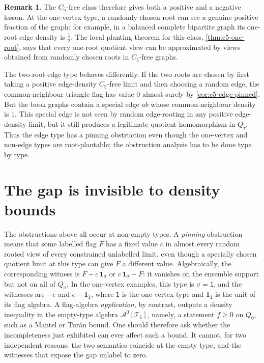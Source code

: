\documentclass[11pt]{article}
\theoremstyle{definition}
\newtheorem{remark}[remark]{Remark}
\newcommand{\A}{\mathcal{A}}
\newcommand{\T}{\mathcal{T}}
\newcommand{\one}{\mathbf 1}
\newcommand{\vtype}{\mathsf{1}}
\begin{document}
\begin{remark}
The $C_5$-free class therefore gives both a positive and a negative lesson.  At the
one-vertex type, a randomly chosen root can see a genuine positive fraction of the graph:
for example, in a balanced complete bipartite graph its one-root edge density is
$\tfrac12$.  The local planting theorem for this class, \cref{thm:c5-one-root}, says that
every one-root quotient view can be approximated by views obtained from randomly chosen
roots in $C_5$-free graphs.

The two-root edge type behaves differently.  If the two roots are chosen by first taking a
positive edge-density $C_5$-free limit and then choosing a random edge, the
common-neighbour triangle flag has value $0$ almost surely by
\cref{cor:c5-edge-pinned}.  But the book graphs contain a special edge $ab$ whose
common-neighbour density is $1$.  This special edge is not seen by random edge-rooting in
any positive edge-density limit, but it still produces a legitimate quotient homomorphism
in $Q_\tau$.  Thus the edge type has a pinning obstruction even though the one-vertex and
non-edge types are root-plantable; the obstruction analysis has to be done type by type.
\end{remark}

\section{The gap is invisible to density bounds}\label{sec:empty-type}

The obstructions above all occur at non-empty types.  A \emph{pinning}
obstruction means that some labelled flag \(F\) has a fixed value \(c\) in
almost every random rooted view of every constrained unlabelled limit, even
though a specially chosen quotient limit at this type can give \(F\) a different
value.  Algebraically, the corresponding witness is \(F-c\,\one_\sigma\) or
\(c\,\one_\sigma-F\): it vanishes on the ensemble support but not on all of
\(Q_\sigma\).  In the one-vertex examples, this type is \(\sigma=\vtype\), and
the witnesses are \(-e\) and \(e-\one_{\vtype}\), where \(\vtype\) is the
one-vertex type and \(\one_{\vtype}\) is the unit of its flag algebra.  A
flag-algebra \emph{application}, by contrast, outputs a density inequality in
the empty-type algebra $\A^0[\T_1]$, namely, a statement $f\ge0$ on $Q_0$, such as a
Mantel or Tur\'an bound.  One should therefore ask whether the incompleteness
just exhibited can ever affect such a bound.  It cannot, for two independent
reasons: the two semantics coincide at the empty type, and the witnesses that
expose the gap unlabel to zero.
\end{document}
